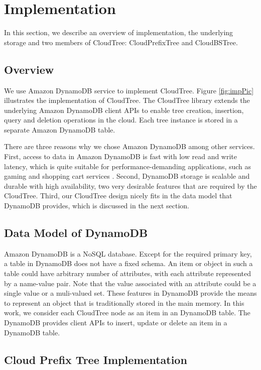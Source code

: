 \documentclass[10pt, conference, compsocconf]{IEEEtran}
\begin{document}
\section{Implementation}
In this section, we describe an overview of implementation, 
the underlying storage and two 
members of CloudTree: CloudPrefixTree and CloudBSTree.

\subsection{Overview}


We use Amazon DynamoDB service to implement CloudTree.  
Figure \ref{fig:impPic} illustrates the implementation of
CloudTree.  The CloudTree library extends the underlying Amazon DynamoDB
client APIs to enable tree creation, insertion, query and deletion
operations in the cloud.  Each tree instance is stored in a separate
Amazon DynamoDB table.

There are three reasons why we chose Amazon DynamoDB among other
services.  First, access to data in
Amazon DynamoDB is fast with low read and write latency,   
which
is quite suitable for performance-demanding
applications, such as gaming and shopping cart
services  \cite{AmazonService13}.  
Second, DynamoDB storage is scalable and durable with high
availability, two very desirable features that
are required by the CloudTree.  Third,
our CloudTree design nicely fits in the data model that DynamoDB provides,
which is discussed in the next section. 



\subsection{Data Model of DynamoDB} 
Amazon DynamoDB is a NoSQL database. Except for the required primary key, a table in DynamoDB does not have a fixed schema. 
An item or object in such a table could have arbitrary number of attributes, with each attribute represented by a name-value pair.
Note that the value associated with an attribute could be a single value or a muli-valued set. 
These features in DynamoDB provide the means to represent an object that is traditionally stored in the main memory.
In this work, we consider each CloudTree node as an item in an DynamoDB table.
The DynamoDB provides client APIs
to insert, update or delete an item in a DynamoDB table.

\subsection{Cloud Prefix Tree Implementation}
\label{prefixtree}
\end{document}
